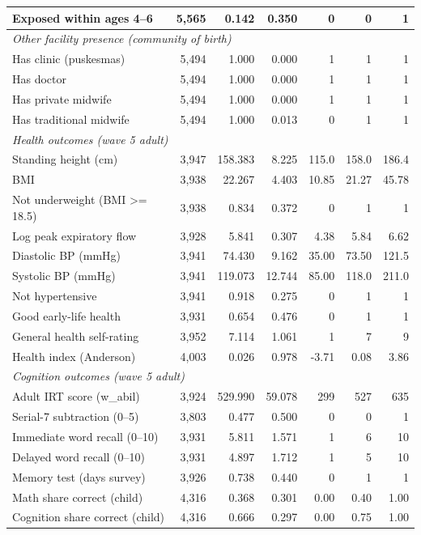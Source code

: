 \begin{longtable}{lrrrrrr}
Exposed within ages 4--6 & 5,565 & 0.142 & 0.350 & 0 & 0 & 1 \\
\midrule
\multicolumn{7}{l}{\emph{Other facility presence (community of birth)}} \\
Has clinic (puskesmas) & 5,494 & 1.000 & 0.000 & 1 & 1 & 1 \\
Has doctor & 5,494 & 1.000 & 0.000 & 1 & 1 & 1 \\
Has private midwife & 5,494 & 1.000 & 0.000 & 1 & 1 & 1 \\
Has traditional midwife & 5,494 & 1.000 & 0.013 & 0 & 1 & 1 \\
\midrule
\multicolumn{7}{l}{\emph{Health outcomes (wave 5 adult)}} \\
Standing height (cm) & 3,947 & 158.383 & 8.225 & 115.0 & 158.0 & 186.4 \\
BMI & 3,938 & 22.267 & 4.403 & 10.85 & 21.27 & 45.78 \\
Not underweight (BMI >= 18.5) & 3,938 & 0.834 & 0.372 & 0 & 1 & 1 \\
Log peak expiratory flow & 3,928 & 5.841 & 0.307 & 4.38 & 5.84 & 6.62 \\
Diastolic BP (mmHg) & 3,941 & 74.430 & 9.162 & 35.00 & 73.50 & 121.5 \\
Systolic BP (mmHg) & 3,941 & 119.073 & 12.744 & 85.00 & 118.0 & 211.0 \\
Not hypertensive & 3,941 & 0.918 & 0.275 & 0 & 1 & 1 \\
Good early-life health & 3,931 & 0.654 & 0.476 & 0 & 1 & 1 \\
General health self-rating & 3,952 & 7.114 & 1.061 & 1 & 7 & 9 \\
Health index (Anderson) & 4,003 & 0.026 & 0.978 & -3.71 & 0.08 & 3.86 \\
\midrule
\multicolumn{7}{l}{\emph{Cognition outcomes (wave 5 adult)}} \\
Adult IRT score (w\_abil) & 3,924 & 529.990 & 59.078 & 299 & 527 & 635 \\
Serial-7 subtraction (0--5) & 3,803 & 0.477 & 0.500 & 0 & 0 & 1 \\
Immediate word recall (0--10) & 3,931 & 5.811 & 1.571 & 1 & 6 & 10 \\
Delayed word recall (0--10) & 3,931 & 4.897 & 1.712 & 1 & 5 & 10 \\
Memory test (days survey) & 3,926 & 0.738 & 0.440 & 0 & 1 & 1 \\
Math share correct (child) & 4,316 & 0.368 & 0.301 & 0.00 & 0.40 & 1.00 \\
Cognition share correct (child) & 4,316 & 0.666 & 0.297 & 0.00 & 0.75 & 1.00 \\

\end{longtable}
